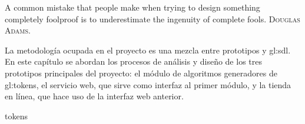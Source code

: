 %
%

{
  \epigrafe
  {%
    A common mistake that people make when trying to design something completely
    foolproof is to underestimate the ingenuity of complete fools.%
  }
  {%
    \textsc{Douglas Adams}.%
  }
}

\noindent
La metodología ocupada en el proyecto es una mezcla entre prototipos y
\gls{gl:sdl}. En este capítulo se abordan los procesos de análisis y
diseño de los tres prototipos principales del proyecto: el módulo de
algoritmos generadores de \glspl{gl:token}, el servicio web, que sirve
como interfaz al primer módulo, y la tienda en línea, que hace uso de
la interfaz web anterior.

{tokens}
